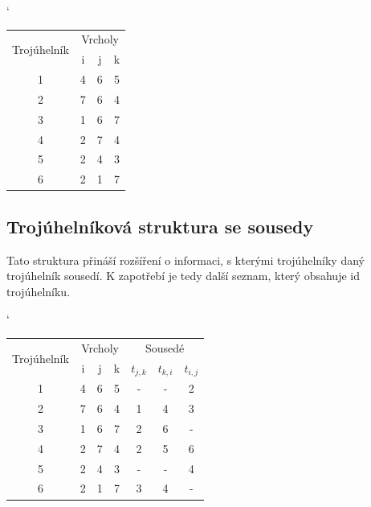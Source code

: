 \documentclass[12pt,a4paper]{article}
\begin{document}
\begin{table}[h]
\catcode`
\begin{tabular}{|c||c|c|c|}
\hline
\multirow{2}{*}{Trojúhelník} & \multicolumn{3}{c|}{Vrcholy} \\ \cline{2-4} 
                             & i        & j       & k       \\ \hline \hline
1                            & 4        & 6       & 5       \\ \hline
2                            & 7        & 6       & 4       \\ \hline
3                            & 1        & 6       & 7       \\ \hline
4                            & 2        & 7       & 4       \\ \hline
5                            & 2        & 4       & 3       \\ \hline
6                            & 2        & 1       & 7       \\ \hline
\end{tabular}
\end{table}



\subsection{Trojúhelníková struktura se sousedy}

Tato struktura přináší rozšíření o informaci, s kterými trojúhelníky daný trojúhelník sousedí. K zapotřebí je tedy další seznam, který obsahuje id trojúhelníku.

\begin{table}[h]
\catcode`
\begin{tabular}{|c||c|c|c||c|c|c|}
\hline
\multirow{2}{*}{Trojúhelník} & \multicolumn{3}{|c|}{Vrcholy} & \multicolumn{3}{|c|}{Sousedé}      \\ \cline{2-7} 
                             & i        & j       & k       & $t_{j,k}$ & $t_{k,i}$ & $t_{i,j}$ \\ \hline \hline
1                            & 4        & 6       & 5       & -         & -         & 2         \\ \hline
2                            & 7        & 6       & 4       & 1         & 4         & 3         \\ \hline
3                            & 1        & 6       & 7       & 2         & 6         & -         \\ \hline
4                            & 2        & 7       & 4       & 2         & 5         & 6         \\ \hline
5                            & 2        & 4       & 3       & -         & -         & 4         \\ \hline
6                            & 2        & 1       & 7       & 3         & 4         & -         \\ \hline
\end{tabular}
\end{table}
\end{document}
